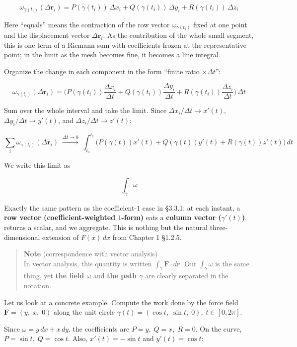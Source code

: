 \[\omega_{\gamma(t_i)}(\Delta\mathbf{r}_i) = P(\gamma(t_i))\,\Delta x_i + Q(\gamma(t_i))\,\Delta y_i + R(\gamma(t_i))\,\Delta z_i\]

Here ``equals'' means the contraction of the row vector
\(\omega_{\gamma(t_i)}\) fixed at one point and the displacement vector
\(\Delta\mathbf{r}_i\). As the contribution of the whole small segment,
this is one term of a Riemann sum with coefficients frozen at the
representative point; in the limit as the mesh becomes fine, it becomes
a line integral.

Organize the change in each component in the form ``finite ratio
\(\times \Delta t\)'':

\[\omega_{\gamma(t_i)}(\Delta\mathbf{r}_i) = \bigl(P(\gamma(t_i))\frac{\Delta x_i}{\Delta t} + Q(\gamma(t_i))\frac{\Delta y_i}{\Delta t} + R(\gamma(t_i))\frac{\Delta z_i}{\Delta t}\bigr)\,\Delta t\]

Sum over the whole interval and take the limit. Since
\(\Delta x_i/\Delta t \to x'(t)\), \(\Delta y_i/\Delta t \to y'(t)\),
and \(\Delta z_i/\Delta t \to z'(t)\):

\[
\sum_i \omega_{\gamma(t_i)}(\Delta\mathbf{r}_i)
\;\xrightarrow{\Delta t \to 0}\;
\int_{t_0}^{t_1}
\bigl(P(\gamma(t))x'(t)+Q(\gamma(t))y'(t)+R(\gamma(t))z'(t)\bigr)\,dt
\]

We write this limit as

\[\int_\gamma \omega\]

Exactly the same pattern as the coefficient-\(1\) case in §3.3.1: at
each instant, a \textbf{row vector (coefficient-weighted $1$-form)} eats
a \textbf{column vector ($\gamma'(t)$)}, returns a scalar, and we
aggregate. This is nothing but the natural three-dimensional extension
of \(F(x)\,dx\) from Chapter 1 §1.2.5.

\begin{quote}
\textbf{Note} (correspondence with vector analysis)\\
In vector analysis, this quantity is written
\(\int_\gamma \mathbf{F}\cdot d\mathbf{r}\). Our \(\int_\gamma \omega\)
is the same thing, yet \textbf{the field $\omega$} and
\textbf{the path $\gamma$} are clearly separated in the notation.
\end{quote}

Let us look at a concrete example. Compute the work done by the force
field \(\mathbf{F} = (y,\; x,\; 0)\) along the unit circle
\(\gamma(t) = (\cos t,\; \sin t,\; 0),\; t \in [0, 2\pi]\).

Since \(\omega = y\,dx + x\,dy\), the coefficients are
\(P=y,\;Q=x,\;R=0\). On the curve, \(P=\sin t,\;Q=\cos t\). Also,
\(x'(t)=-\sin t\) and \(y'(t)=\cos t\):

